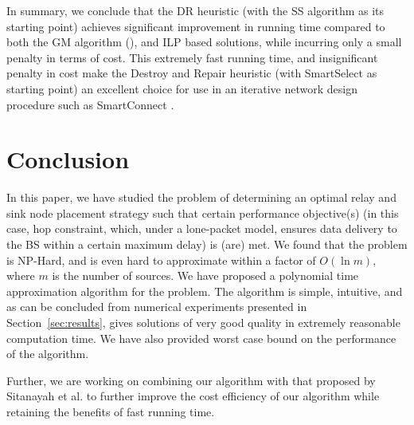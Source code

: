 \documentclass[conference]{IEEEtran}
\begin{document}
In summary, we conclude that the DR heuristic (with the SS algorithm as its starting point) achieves significant improvement in running time compared to both the GM algorithm (\cite{sitanayah}), and ILP based solutions, while incurring only a small penalty in terms of cost. This extremely fast running time, and insignificant penalty in cost make the Destroy and Repair heuristic (with SmartSelect as starting point) an excellent choice for use in an iterative network design procedure such as SmartConnect \cite{smartconnect-paper}.

\section{Conclusion}
\label{sec:conclude}
In this paper, we have studied the problem of determining an optimal relay and sink node placement strategy such that certain performance objective(s) (in this case, hop constraint, which, under a lone-packet model, ensures data delivery to the BS within a certain maximum delay) is (are) met. We found that the problem is NP-Hard, and is even hard to approximate within a factor of $O(\ln m)$, where $m$ is the number of sources. We have proposed a polynomial time approximation algorithm for the problem. The algorithm is simple, intuitive, and as can be concluded from numerical experiments presented in Section~\ref{sec:results}, gives solutions of very good quality in extremely reasonable computation time. We have also provided worst case bound on the performance of the algorithm. 

Further, we are working on combining our algorithm with that proposed by Sitanayah et al. \cite{sitanayah} to further improve the cost efficiency of our algorithm while retaining the benefits of fast running time. 
  


\end{document}
